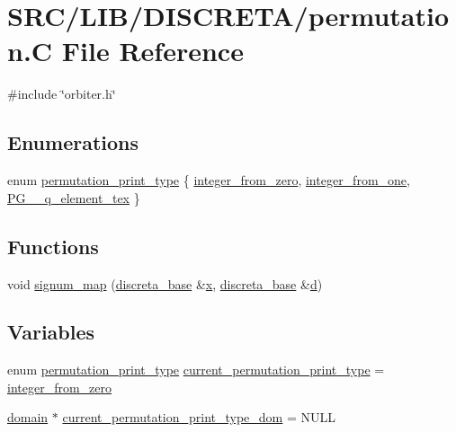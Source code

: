 \hypertarget{permutation_8_c}{}\section{S\+R\+C/\+L\+I\+B/\+D\+I\+S\+C\+R\+E\+T\+A/permutation.C File Reference}
\label{permutation_8_c}
{\ttfamily \#include \char`\"{}orbiter.\+h\char`\"{}}\newline
\subsection*{Enumerations}
\begin{DoxyCompactItemize}
\item 
enum \mbox{\hyperlink{permutation_8_c_affe71e1818a66436dd61925e4b1db406}{permutation\+\_\+print\+\_\+type}} \{ \mbox{\hyperlink{permutation_8_c_affe71e1818a66436dd61925e4b1db406a8fecd513084bd2a80ab98fffc8475866}{integer\+\_\+from\+\_\+zero}}, 
\mbox{\hyperlink{permutation_8_c_affe71e1818a66436dd61925e4b1db406afa604eac867c18fbc4411d722bb66198}{integer\+\_\+from\+\_\+one}}, 
\mbox{\hyperlink{permutation_8_c_affe71e1818a66436dd61925e4b1db406a6aedd5ce102bc39c4f3123e04f995842}{P\+G\+\_\+\_\+q\+\_\+element\+\_\+tex}}
 \}
\end{DoxyCompactItemize}
\subsection*{Functions}
\begin{DoxyCompactItemize}
\item 
void \mbox{\hyperlink{permutation_8_c_a37eb45eba12583dd550bfdf02d8add81}{signum\+\_\+map}} (\mbox{\hyperlink{classdiscreta__base}{discreta\+\_\+base}} \&\mbox{\hyperlink{alphabet2_8_c_a6150e0515f7202e2fb518f7206ed97dc}{x}}, \mbox{\hyperlink{classdiscreta__base}{discreta\+\_\+base}} \&\mbox{\hyperlink{simeon_8_c_a4339ca06fa882e69473d37bd6d7917d1}{d}})
\end{DoxyCompactItemize}
\subsection*{Variables}
\begin{DoxyCompactItemize}
\item 
enum \mbox{\hyperlink{permutation_8_c_affe71e1818a66436dd61925e4b1db406}{permutation\+\_\+print\+\_\+type}} \mbox{\hyperlink{permutation_8_c_a9a54d0723745eff2139081994296edb4}{current\+\_\+permutation\+\_\+print\+\_\+type}} = \mbox{\hyperlink{permutation_8_c_affe71e1818a66436dd61925e4b1db406a8fecd513084bd2a80ab98fffc8475866}{integer\+\_\+from\+\_\+zero}}
\item 
\mbox{\hyperlink{classdomain}{domain}} $\ast$ \mbox{\hyperlink{permutation_8_c_a68b6d21ac5ec1da5acaba5cf7b33bc8b}{current\+\_\+permutation\+\_\+print\+\_\+type\+\_\+dom}} = N\+U\+LL
\end{DoxyCompactItemize}


